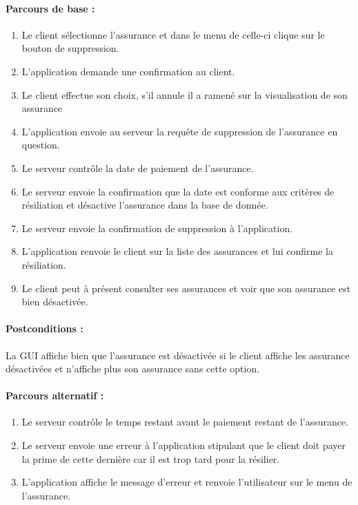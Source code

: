 \documentclass[../annexe.tex]{subfiles}
\begin{document}
\paragraph{Parcours de base :}
		\begin{enumerate}
				\item Le client sélectionne l'assurance et dans le menu de celle-ci clique sur le bouton de suppression.
				\item L'application demande une confirmation au client.
				\item Le client effectue son choix, s'il annule il a ramené sur la visualisation de son assurance
				\item L'application envoie au serveur la requête de suppression de l'assurance en question.
				\item Le serveur contrôle la date de paiement de l'assurance.
				\item Le serveur envoie la confirmation que la date est conforme aux critères de résiliation et désactive l'assurance dans la base de donnée.
				\item Le serveur envoie la confirmation de suppression à l'application.
				\item L'application renvoie le client sur la liste des assurances et lui confirme la résiliation.
				\item Le client peut à présent consulter ses assurances et voir que son assurance est bien désactivée.
		\end{enumerate}
\paragraph{Postconditions :}
		La GUI affiche bien que l'assurance est désactivée si le client affiche les assurance désactivées et n'affiche plus son assurance sans cette option.

\paragraph{Parcours alternatif :}
\begin{enumerate}
		\item Le serveur contrôle le temps restant avant le paiement restant de l'assurance.
		\item Le serveur envoie une erreur à l'application stipulant que le client doit payer la prime de cette dernière car il est trop tard pour la résilier.
		\item L'application affiche le message d'erreur et renvoie l'utilisateur sur le menu de l'assurance.
\end{enumerate}
\newpage
\end{document}
